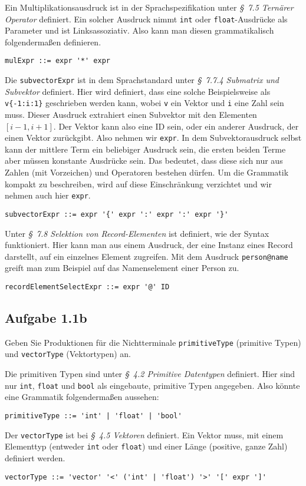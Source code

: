 \documentclass[
  ngerman,
  DIV=14
]{scrartcl}
\begin{document}
\bigskip\noindent
Ein Multiplikationsausdruck ist in der Sprachspezifikation unter \emph{§~7.5 Ternärer Operator} definiert. Ein solcher Ausdruck nimmt \verb|int| oder \verb|float|-Ausdrücke als Parameter und ist Linksassoziativ. Also kann man diesen grammatikalisch folgendermaßen definieren. 
\begin{verbatim}
mulExpr ::= expr '*' expr
\end{verbatim}
Die \verb|subvectorExpr| ist in dem Sprachstandard unter \emph{§~7.7.4 Submatrix und Subvektor} definiert. Hier wird definiert, dass eine solche Beispielsweise als \verb|v{-1:i:1}| geschrieben werden kann, wobei \verb|v| ein Vektor und \verb|i| eine Zahl sein muss. Dieser Ausdruck extrahiert einen Subvektor mit den Elementen $[i-1, i+1]$. Der Vektor kann also eine ID sein, oder ein anderer Ausdruck, der einen Vektor zurückgibt. Also nehmen wir \texttt{expr}. In dem Subvektorausdruck selbst kann der mittlere Term ein beliebiger Ausdruck sein, die ersten beiden Terme aber müssen konstante Ausdrücke sein. Das bedeutet, dass diese sich nur aus Zahlen (mit Vorzeichen) und Operatoren bestehen dürfen. Um die Grammatik kompakt zu beschreiben, wird auf diese Einschränkung verzichtet und wir nehmen auch hier \texttt{expr}.
\begin{verbatim}
subvectorExpr ::= expr '{' expr ':' expr ':' expr '}'  
\end{verbatim}
Unter \emph{§~7.8 Selektion von Record-Elementen} ist definiert, wie der Syntax funktioniert. Hier kann man aus einem Ausdruck, der eine Instanz eines Record darstellt, auf ein einzelnes Element zugreifen. Mit dem Ausdruck \texttt{person@name} greift man zum Beispiel auf das Namenselement einer Person zu. 
\begin{verbatim}
recordElementSelectExpr ::= expr '@' ID  
\end{verbatim}

\subsection*{Aufgabe 1.1b}

Geben Sie Produktionen für die Nichtterminale \verb|primitiveType| (primitive Typen) und \verb|vectorType| (Vektortypen) an.

\bigskip\noindent
Die primitiven Typen sind unter \emph{§~4.2 Primitive Datentypen} definiert. Hier sind nur \texttt{int}, \texttt{float} und \texttt{bool} als eingebaute, primitive Typen angegeben. Also könnte eine Grammatik folgendermaßen aussehen:
\begin{verbatim}
primitiveType ::= 'int' | 'float' | 'bool'
\end{verbatim}
Der \texttt{vectorType} ist bei \emph{§~4.5 Vektoren} definiert. Ein Vektor muss, mit einem Elementtyp (entweder \texttt{int} oder \texttt{float}) und einer Länge (positive, ganze Zahl) definiert werden.
\begin{verbatim}
vectorType ::= 'vector' '<' ('int' | 'float') '>' '[' expr ']'
\end{verbatim}
\end{document}
